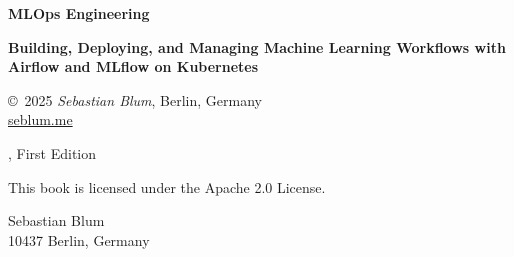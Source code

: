 \thispagestyle{empty}




\iffalse
\thispagestyle{empty}

\vspace{3cm}
  \begin{center}
    {
	\bfseries \sffamily \Huge MLOps Engineering\par
	\bfseries \LARGE Building, Deploying, and Managing Machine Learning Workflows with Airflow and MLflow on Kubernetes\par
~\\
	~\\
	\bfseries \small Published by Sebastian Blum, Berlin\par
      }
  \end{center}


\newpage
\fi



\thispagestyle{empty}
\begin{center}
  {
  \bfseries \sffamily \LARGE MLOps Engineering\par
  \bfseries \small Building, Deploying, and Managing Machine Learning Workflows with Airflow and MLflow on Kubernetes\par
}

\copyright~2025 \textit{Sebastian Blum}, Berlin, Germany\\
\url{seblum.me}

	\the\year, First Edition



This book is licensed under the Apache 2.0 License.


Sebastian Blum \\
10437 Berlin, Germany \\

\vspace*{1cm}


\end{center}


